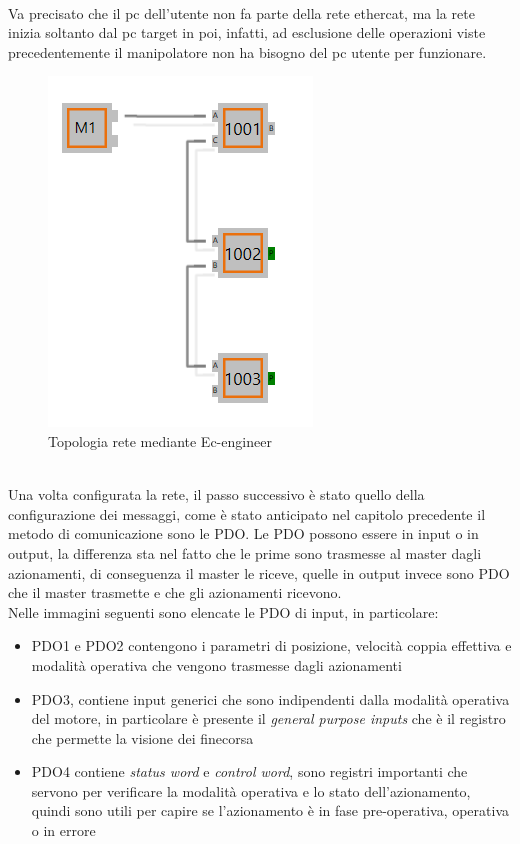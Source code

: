 \\Va precisato che il pc dell'utente non fa parte della rete ethercat, ma la rete inizia soltanto dal pc target in poi, infatti, ad esclusione delle operazioni viste precedentemente il manipolatore non ha bisogno del pc utente per funzionare.
\begin{figure}[ht]
	\begin{center}
		\includegraphics[scale=0.7]{Immagini/Sperimentale/NetTopology.png}
		\caption{Topologia rete mediante Ec-engineer}
		\label{fig:NetTopology2}
	\end{center}
\end{figure}
\\Una volta configurata la rete, il passo successivo è stato quello della configurazione dei messaggi, come è stato anticipato nel capitolo precedente il metodo di comunicazione sono le PDO. Le PDO possono essere in input o in output, la differenza sta nel fatto che le prime sono trasmesse al master dagli azionamenti, di conseguenza il master le riceve, quelle in output invece sono PDO che il master trasmette e che gli azionamenti ricevono. 
\\Nelle immagini seguenti sono elencate le PDO di input, in particolare:
\begin{itemize}
 	\item PDO1 e PDO2 contengono i parametri di posizione, velocità coppia effettiva e modalità operativa che vengono trasmesse dagli azionamenti
 	\item PDO3, contiene input generici che sono indipendenti dalla modalità operativa del motore, in particolare è presente il \textit{general purpose inputs} che è il registro che permette la visione dei finecorsa
 	\item PDO4 contiene \textit{status word} e \textit{control word}, sono registri importanti che servono per verificare la modalità operativa e lo stato dell'azionamento, quindi sono utili per capire se l'azionamento è in fase pre-operativa, operativa o in errore
\end{itemize}
